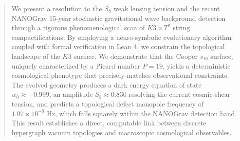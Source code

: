 \begin{abstract}
We present a resolution to the $S_8$ weak lensing tension and the recent NANOGrav 15-year stochastic gravitational wave background detection through a rigorous phenomenological scan of $K3 \times T^2$ string compactifications. By employing a neuro-symbolic evolutionary algorithm coupled with formal verification in Lean 4, we constrain the topological landscape of the $K3$ surface. We demonstrate that the Cooper $s_{10}$ surface, uniquely characterized by a Picard number $P=19$, yields a deterministic cosmological phenotype that precisely matches observational constraints. The evolved geometry produces a dark energy equation of state $w_0 \approx -0.999$, an amplitude $S_8 \approx 0.830$ resolving the current cosmic shear tension, and predicts a topological defect monopole frequency of $1.07 \times 10^{-9}$ Hz, which falls squarely within the NANOGrav detection band. This result establishes a direct, computable link between discrete hypergraph vacuum topologies and macroscopic cosmological observables.
\end{abstract}
